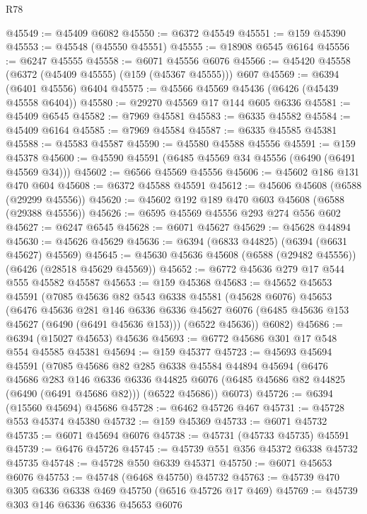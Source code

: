 \begin{lexlean}{R78}
\begin{coremodule}
@45549 := @45409 @6082
@45550 := @6372 @45549
@45551 := @159 @45390
@45553 := @45548 (@45550 @45551)
@45555 := @18908 @6545 @6164
@45556 := @6247 @45555
@45558 := @6071 @45556 @6076
@45566 := @45420 @45558 (@6372 (@45409 @45555) (@159 (@45367 @45555))) @607
@45569 := @6394 (@6401 @45556) @6404
@45575 := @45566 @45569 @45436 (@6426 (@45439 @45558 @6404))
@45580 := @29270 @45569 @17 @144 @605 @6336
@45581 := @45409 @6545
@45582 := @7969 @45581
@45583 := @6335 @45582
@45584 := @45409 @6164
@45585 := @7969 @45584
@45587 := @6335 @45585 @45381
@45588 := @45583 @45587
@45590 := @45580 @45588 @45556
@45591 := @159 @45378
@45600 := @45590 @45591 (@6485 @45569 @34 @45556 (@6490 (@6491 @45569 @34)))
@45602 := @6566 @45569 @45556
@45606 := @45602 @186 @131 @470 @604
@45608 := @6372 @45588 @45591
@45612 := @45606 @45608 (@6588 (@29299 @45556))
@45620 := @45602 @192 @189 @470 @603 @45608 (@6588 (@29388 @45556))
@45626 := @6595 @45569 @45556 @293 @274 @556 @602
@45627 := @6247 @6545
@45628 := @6071 @45627
@45629 := @45628 @44894
@45630 := @45626 @45629
@45636 := @6394 (@6833 @44825) (@6394 (@6631 @45627) @45569)
@45645 := @45630 @45636 @45608 (@6588 (@29482 @45556)) (@6426 (@28518 @45629 @45569))
@45652 := @6772 @45636 @279 @17 @544 @555 @45582 @45587
@45653 := @159 @45368
@45683 := @45652
    @45653
    @45591
    (@7085
      @45636
      @82
      @543
      @6338
      @45581
      (@45628 @6076)
      @45653
      (@6476
        @45636
        @281
        @146
        @6336
        @6336
        @45627
        @6076
        (@6485 @45636 @153 @45627 (@6490 (@6491 @45636 @153)))
        (@6522 @45636))
      @6082)
@45686 := @6394 (@15027 @45653) @45636
@45693 := @6772 @45686 @301 @17 @548 @554 @45585 @45381
@45694 := @159 @45377
@45723 := @45693
    @45694
    @45591
    (@7085
      @45686
      @82
      @285
      @6338
      @45584
      @44894
      @45694
      (@6476
        @45686
        @283
        @146
        @6336
        @6336
        @44825
        @6076
        (@6485 @45686 @82 @44825 (@6490 (@6491 @45686 @82)))
        (@6522 @45686))
      @6073)
@45726 := @6394 (@15560 @45694) @45686
@45728 := @6462 @45726 @467
@45731 := @45728 @553 @45374 @45380
@45732 := @159 @45369
@45733 := @6071 @45732
@45735 := @6071 @45694 @6076
@45738 := @45731 (@45733 @45735) @45591
@45739 := @6476 @45726
@45745 := @45739 @551 @356 @45372 @6338 @45732 @45735
@45748 := @45728 @550 @6339 @45371
@45750 := @6071 @45653 @6076
@45753 := @45748 (@6468 @45750) @45732
@45763 := @45739 @470 @305 @6336 @6338 @469 @45750 (@6516 @45726 @17 @469)
@45769 := @45739 @303 @146 @6336 @6336 @45653 @6076

\end{coremodule}
\end{lexlean}

